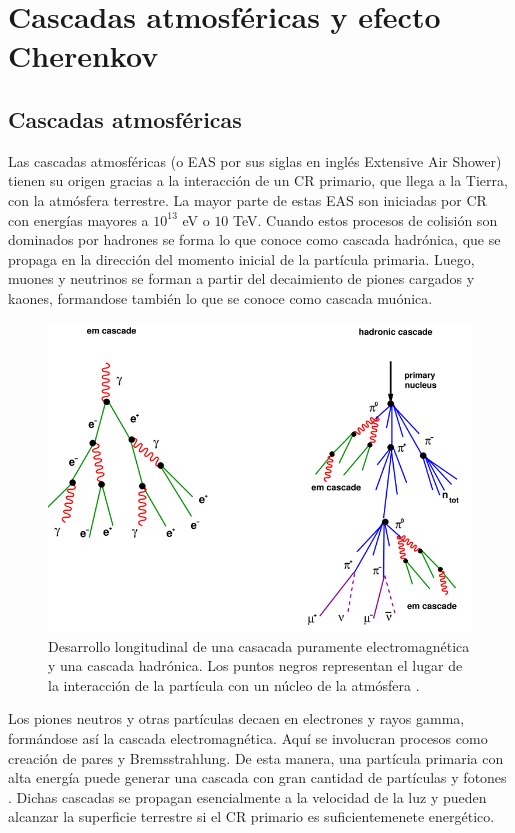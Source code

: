 \chapter{Cascadas atmosféricas y efecto Cherenkov} \label{EAS_Y_CHERENKOV}
\section{Cascadas atmosféricas} \label{EAS}
	Las cascadas atmosféricas (o EAS por sus siglas en inglés Extensive Air Shower) tienen su origen gracias a la interacción de un CR primario, que llega a la Tierra, con la atmósfera terrestre. La mayor parte de estas EAS son iniciadas por CR con energías mayores a $10^{13}$ eV o $10$ TeV. Cuando estos procesos de colisión son dominados por hadrones se forma lo que conoce como cascada hadrónica, que se propaga en la dirección del momento inicial de la partícula primaria. Luego, muones y neutrinos se forman a partir del decaimiento de piones cargados y kaones, formandose también lo que se conoce como cascada muónica.

	\begin{figure}[h]
		\centering
		\includegraphics[scale = 0.5]{FIGURAS/CASCADA_LONGITUDINAL.png}
		\caption{Desarrollo longitudinal de una casacada puramente electromagnética y una cascada hadrónica. Los puntos negros representan el lugar de la interacción de la partícula con un núcleo de la atmósfera \cite{MOLLERACH201885}.}
		\label{Cascada_longitudinal}
	\end{figure}

	Los piones neutros y otras partículas decaen en electrones y rayos gamma, formándose así la cascada electromagnética. Aquí se involucran procesos como creación de pares y Bremsstrahlung. De esta manera, una partícula primaria con alta energía puede generar una cascada con gran cantidad de partículas y fotones \cite{GRIEDER2010}.  Dichas cascadas se propagan esencialmente a la velocidad de la luz y pueden alcanzar la superficie terrestre si el CR primario es suficientemenete energético.


